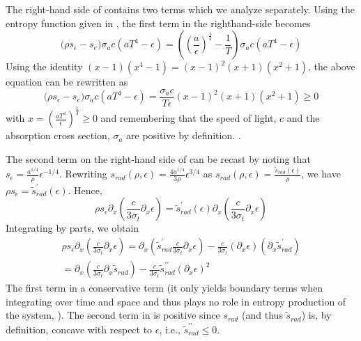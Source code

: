 \documentclass[review]{elsarticle}
\begin{document}
The right-hand side of  contains two terms which we analyze separately. Using the entropy function given in , the first term in the righthand-side becomes
%
\begin{equation} 
\Big( \rho s_\epsilon -s_e \Big)  \sigma_a c \left( a T^4 - \epsilon \right) 
= \left( \left( \frac{a}{\epsilon}\right)^\frac{1}{4} - \frac{1}{T} \right)   \sigma_a c \left( a T^4 - \epsilon \right) 
\end{equation}
Using the identity $(x-1)(x^4-1) = (x-1)^2(x+1)(x^2+1)$, the above equation can be rewritten as
\begin{equation} 
\Big( \rho s_\epsilon -s_e \Big)  \sigma_a c \left( a T^4 - \epsilon \right) 
= \frac{\sigma_a c}{T \epsilon}  (x-1)^2(x+1)(x^2+1) \geq 0
\end{equation}
%
with $x=  \left(\frac{aT^4}{\epsilon}\right)^\frac{1}{4} \geq 0$ and remembering that the speed of light, $c$ and the absorption cross section, $\sigma_a$ are positive by definition. .

The second term on the right-hand side of  can be recast by noting that $s_\epsilon = \frac{a^{1/4}}{\rho} \epsilon^{-1/4}$. Rewriting $s_{rad}(\rho, \epsilon) = \frac{4a^{1/4}}{3\rho} \epsilon^{3/4}$ as  $s_{rad}(\rho, \epsilon) = \frac{\tilde{s}_{rad}(\epsilon)}{\rho}$, we have
$ \rho s_\epsilon = \tilde{s}^\prime_{rad}(\epsilon)$. Hence, 
\begin{equation}
\rho s_\epsilon \partial_x \left( \frac{c}{3 \sigma_t} \partial_x \epsilon \right) 
=
 \tilde{s}^\prime_{rad}(\epsilon) \partial_x \left( \frac{c}{3 \sigma_t} \partial_x \epsilon \right) 
\end{equation}
%
Integrating by parts, we obtain
%
\begin{multline} \label{eq:final_form_second_term}
\rho s_\epsilon \partial_x \left( \frac{c}{3 \sigma_t} \partial_x \epsilon \right) 
=
 \partial_x \left(  \tilde{s}^\prime_{rad}  \frac{c}{3 \sigma_t} \partial_x \epsilon \right) 
-
\frac{c}{3 \sigma_t} \left(  \partial_x \epsilon \right)  \left( \partial_x \tilde{s}^\prime_{rad}  \right) \\
=
 \partial_x \left(   \frac{c}{3 \sigma_t} \partial_x \tilde{s}_{rad}  \right) 
-
\frac{c}{3 \sigma_t} \tilde{s}^{\prime\prime}_{rad}  \left(  \partial_x \epsilon \right)^2   \qquad  \qquad  \qquad \ 
\end{multline}
%
The first term in  a conservative term (it only yields boundary terms when integrating over time and space and thus plays no role in entropy production of the system, \cite{Leveque}). The second term  in  is positive 
since $s_{rad}$ (and thus $\tilde{s}_{rad}$) is, by definition, concave with respect to $\epsilon$, i.e., $\tilde{s}^{\prime\prime}_{rad} \leq 0$.
\end{document}
